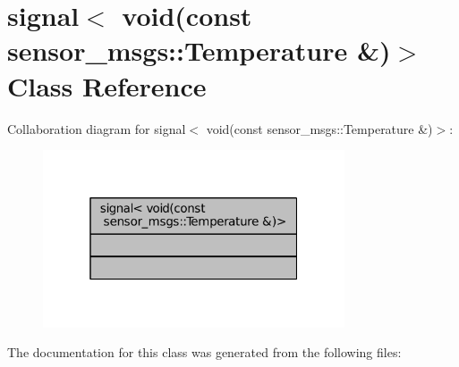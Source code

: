 \hypertarget{classboost_1_1signals2_1_1signal_3_01void_07const_01sensor__msgs_1_1Temperature_01_6_08_4}{}\section{signal$<$ void(const sensor\+\_\+msgs\+:\+:Temperature \&)$>$ Class Reference}
\label{classboost_1_1signals2_1_1signal_3_01void_07const_01sensor__msgs_1_1Temperature_01_6_08_4}


Collaboration diagram for signal$<$ void(const sensor\+\_\+msgs\+:\+:Temperature \&)$>$\+:
\nopagebreak
\begin{figure}[H]
\begin{center}
\leavevmode
\includegraphics[width=253pt]{classboost_1_1signals2_1_1signal_3_01void_07const_01sensor__msgs_1_1Temperature_01_6_08_4__coll__graph}
\end{center}
\end{figure}


The documentation for this class was generated from the following files\+: